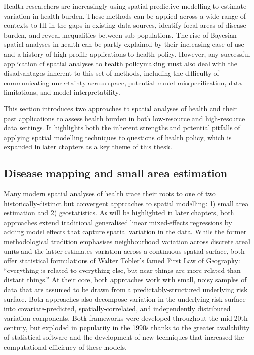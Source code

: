 \documentclass[
]{report}
\begin{document}
Health researchers are increasingly using spatial predictive modelling to estimate variation in health burden. These methods can be applied across a wide range of contexts to fill in the gaps in existing data sources, identify focal areas of disease burden, and reveal inequalities between sub-populations. The rise of Bayesian spatial analyses in health can be partly explained by their increasing ease of use and a history of high-profile applications to health policy. However, any successful application of spatial analyses to health policymaking must also deal with the disadvantages inherent to this set of methods, including the difficulty of communicating uncertainty across space, potential model misspecification, data limitations, and model interpretability.

This section introduces two approaches to spatial analyses of health and their past applications to assess health burden in both low-resource and high-resource data settings. It highlights both the inherent strengths and potential pitfalls of applying spatial modelling techniques to questions of health policy, which is expanded in later chapters as a key theme of this thesis.

\hypertarget{disease-mapping-and-small-area-estimation}{%
\subsection{Disease mapping and small area estimation}\label{disease-mapping-and-small-area-estimation}}

Many modern spatial analyses of health trace their roots to one of two historically-distinct but convergent approaches to spatial modelling: 1) small area estimation and 2) geostatistics. As will be highlighted in later chapters, both approaches extend traditional generalised linear mixed-effects regressions by adding model effects that capture spatial variation in the data. While the former methodological tradition emphasises neighbourhood variation across discrete areal units and the latter estimates variation across a continuous spatial surface, both offer statistical formulations of Walter Tobler's famed First Law of Geography: ``everything is related to everything else, but near things are more related than distant things.\autocite{Tobler1970}'' At their core, both approaches work with small, noisy samples of data that are assumed to be drawn from a predictably-structured underlying risk surface. Both approaches also decompose variation in the underlying risk surface into covariate-predicted, spatially-correlated, and independently distributed variation components.\autocite{Riebler2016} Both frameworks were developed throughout the mid-20th century, but exploded in popularity in the 1990s thanks to the greater availability of statistical software and the development of new techniques that increased the computational efficiency of these models.\autocite{Besag1991,Lindgren2011}
\end{document}
